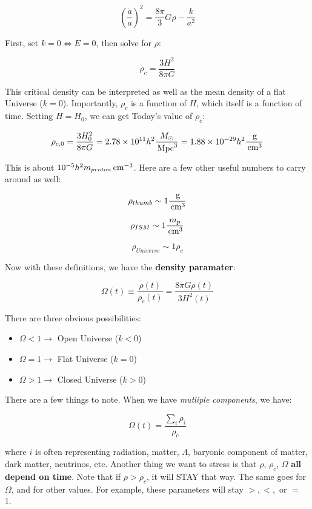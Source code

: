 \documentclass{article}
\newcommand{\unit}[1]{{\,\rm #1}}
\newcommand{\be}{\begin{equation}}
\newcommand{\ee}{\end{equation}}
\newcommand{\Mpc}{\unit{Mpc}}
\newcommand{\g}{\unit{g}}
\newcommand{\cm}{\unit{cm}}
\def\iff{\Leftrightarrow}
\def\iff{\Leftrightarrow}
\begin{document}
\begin{equation}
    \left(\frac{\dot a}{a}\right)^2 = \frac{8\pi}{3}G\rho - \frac{k}{a^2}
\end{equation}

First, set $k = 0 \iff E = 0$, then solve for $\rho$:

\be
    \boxed{\rho_c = \frac{3H^2}{8\pi G}}
\ee

This critical density can be interpreted as well as the mean density of a flat Universe ($k=0$). Importantly, $\rho_c$ is a function of $H$, which itself is a function of time. Setting $H = H_0$, we can get Today's value of $\rho_c$:

\be
    \rho_{c,0} = \frac{3H_0^2}{8\pi G} = 2.78 \times 10^{11} h^2 \frac{M_\odot}{\Mpc^3} = 1.88 \times 10^{-29} h^2 \frac{\g}{\cm^3}
\ee

This is about $10^{-5} h^2 m_{proton} \cm^{-3}$. Here are a few other useful numbers to carry around as well:

\be
    \rho_{thumb} \sim 1 \frac{\g}{\cm^3}
\ee

\be
    \rho_{ISM} \sim 1 \frac{m_p}{\cm^3}
\ee

\be
    \rho_{Universe} \sim 1 \rho_c
\ee

Now with these definitions, we have the \textbf{density paramater}:

\be
\Omega(t) \equiv \frac{\rho(t)}{\rho_c(t)} = \frac{8\pi G \rho(t)}{3H^2(t)}
\ee

There are three obvious possibilities:

\begin{itemize}
    \item $\Omega <1 \rightarrow$ Open Universe ($k<0$)
    \item $\Omega = 1\rightarrow$ Flat Universe ($k=0$)
    \item $\Omega >1 \rightarrow$ Closed Universe ($k>0$)
\end{itemize}

There are a few things to note. When we have \textit{mutliple components}, we have:

\be
\Omega(t) = \frac{\sum_{i} \rho_i}{\rho_c}
\ee

where $i$ is often representing radiation, matter, $\Lambda$, baryonic component of matter, dark matter, neutrinos, etc. Another thing we want to stress is that $\rho$, $\rho_c$, $\Omega$ \textbf{all depend on time}. Note that if $\rho > \rho_c$, it will STAY that way. The same goes for $\Omega$, and for other values. For example, these parameters will stay $>, <,$ or $=$ 1. 
\end{document}
